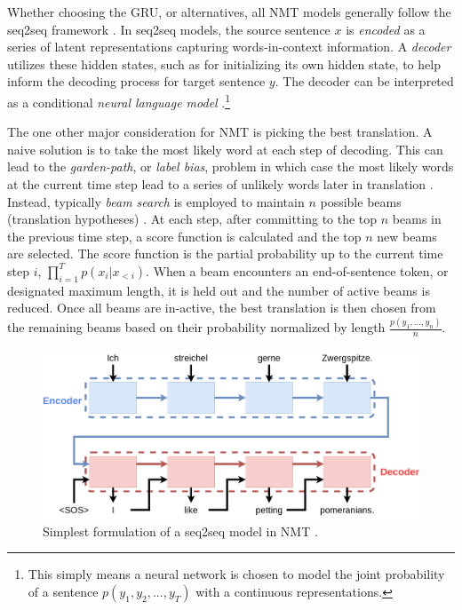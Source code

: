 Whether choosing the \ac{GRU}, or alternatives,  all \ac{NMT} models generally follow the \ac{seq2seq} framework \cite{vinyals2015grammaras}. In \ac{seq2seq} models, the source sentence $x$ is \textit{encoded} as a series of latent representations capturing words-in-context information. A \textit{decoder} utilizes these hidden states, such as for initializing its own hidden state, to help inform the decoding process for target sentence $y$. The decoder can be interpreted as a conditional \textit{neural language model} \cite{koehn2017NMT}.\footnote{This simply means a neural network is chosen to model the joint probability of a sentence $p(y_{1}, y_{2}, ..., y_{T})$ with a continuous representations.}

The one other major consideration for \ac{NMT} is picking the best translation. A naive solution is to take the most likely word at each step of decoding. This can lead to the \textit{garden-path}, or \textit{label bias}, problem in which case the most likely words at the current time step lead to a series of unlikely words later in translation \cite{lafferty2001CRF,koehn2017NMT}. Instead, typically \textit{beam search} is employed to maintain $n$ possible beams (translation hypotheses) \cite{koehn2017NMT}. At each step, after committing to the top $n$ beams  in the previous time step, a score function is calculated and the top $n$ new beams are selected. The score function is the partial probability up to the current time step $i$, $\prod^{T}_{i=1} p(x_{i} | x_{<i})$. When a beam encounters an end-of-sentence token, or designated maximum length, it is held out and the number of active beams is reduced. Once all beams are in-active, the best translation is then chosen from the remaining beams based on their probability normalized by length $\frac{p(y_{1}, ..., y_{n})}{n}$. 

\begin{figure}
	\includegraphics[width=\linewidth]{seq2seq.png}
	\caption{Simplest formulation of a \ac{seq2seq} model in \ac{NMT} \cite{sutskever2014seq2seq}.} 
	\label{fig:seqseq2}
\end{figure}



